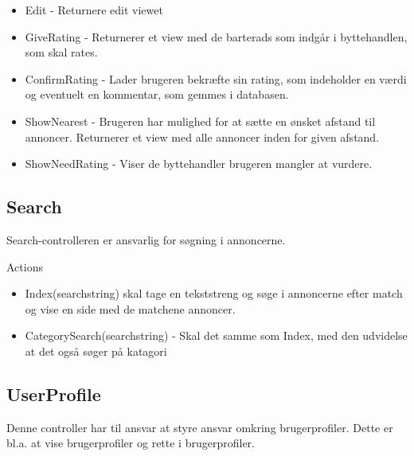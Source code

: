 \begin{itemize}
	\item Edit - Returnere edit viewet
	\item GiveRating - Returnerer et view med de barterads som indgår i byttehandlen, som skal rates.
	\item ConfirmRating - Lader brugeren bekræfte sin rating, som indeholder en værdi og eventuelt en kommentar, som gemmes i databasen.
	\item ShowNearest - Brugeren har mulighed for at sætte en ønsket afstand til annoncer. Returnerer et view med alle annoncer inden for given afstand.
	\item ShowNeedRating - Viser de byttehandler brugeren mangler at vurdere.
\end{itemize}

%
%	


\subsection{Search}
Search-controlleren er ansvarlig for søgning i annoncerne. 

Actions 
\begin{itemize}
	\item Index(searchstring) skal tage en tekststreng og søge i annoncerne efter match og vise en side med de matchene annoncer.
	\item CategorySearch(searchstring) - Skal det samme som Index, med den udvidelse at det også søger på katagori
\end{itemize}

\subsection{UserProfile}
Denne controller har til ansvar at styre ansvar omkring brugerprofiler. Dette er bl.a. at vise brugerprofiler og rette i brugerprofiler.

